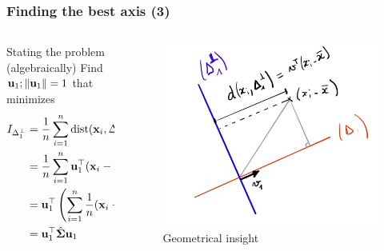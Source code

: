 \documentclass{beamer}\usepackage[]{graphicx}\usepackage[]{color}
\begin{document}
\begin{frame}
  \frametitle{Finding the best axis (3)}

\begin{columns}
  \begin{column}{.5\textwidth}
  \begin{block}{Stating the problem (algebraically)}
    Find $\mathbf{u}_1; \|\mathbf{u}_1 \|=1$ that minimizes
    \begin{equation*}
      \begin{aligned}
        I_{\Delta_1^\bot} & = \frac{1}{n}\sum_{i=1}^n \text{dist}(\mathbf{x}_i,\Delta_1^\bot)^2 \\ 
        & = \frac{1}{n}\sum_{i=1}^n \mathbf{u}_1^\top (\mathbf{x}_i - \bar{\mathbf{x}})(\mathbf{x}_i - \bar{\mathbf{x}})^\top \mathbf{u}_1 \\
        & = \mathbf{u}_1^\top \left( \sum_{i=1}^n \frac{1}{n}(\mathbf{x}_i - \bar{\mathbf{x}})(\mathbf{x}_i - \bar{\mathbf{x}})^\top \right)  \mathbf{u}_1 \\
        & = \mathbf{u}_1^\top \hat{\boldsymbol{\Sigma}}  \mathbf{u}_1
      \end{aligned}
    \end{equation*} 
  \end{block}  
  \end{column}
  \begin{column}{.45\textwidth}
  \begin{figure}
    \includegraphics[width=.9\textwidth]{solving_inertia}
    \caption{Geometrical insight}
  \end{figure}
  \end{column}
\end{columns}
  
\end{frame}
\end{document}
